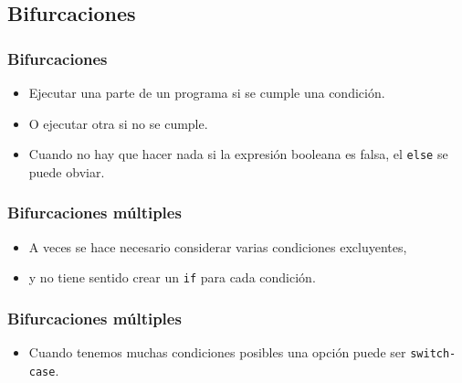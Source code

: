 \subsection{Bifurcaciones}
\begin{frame}[label=bifuraciones,fragile]
 \frametitle{Bifurcaciones}
 \begin{itemize}
    \item Ejecutar una parte de un programa si se cumple una \alert{condición}.
    \item O ejecutar otra si no se cumple.
 \end{itemize}
 \begin{small}
  \lstI
 \end{small}
 \begin{itemize}
    \item Cuando no hay que hacer nada si la expresión booleana es falsa, el
      \alert{\texttt{else}} se puede obviar.
 \end{itemize}
\end{frame}
\begin{frame}[label=bifuraciones_multiples,fragile]
 \frametitle{Bifurcaciones múltiples}
 \begin{itemize}
    \item A veces se hace necesario considerar varias condiciones excluyentes,
    \item y no tiene sentido crear un \alert{\texttt{if}} para cada condición.
 \end{itemize}
 \begin{small}
  \lstI
 \end{small}
\end{frame}
\begin{frame}[label=case,fragile]
 \frametitle{Bifurcaciones múltiples}
 \begin{itemize}
    \item Cuando tenemos muchas condiciones posibles una opción puede ser
      \alert{\texttt{switch-case}}.
 \end{itemize}
 \begin{small}
   \lstI
 \end{small}
\end{frame}
